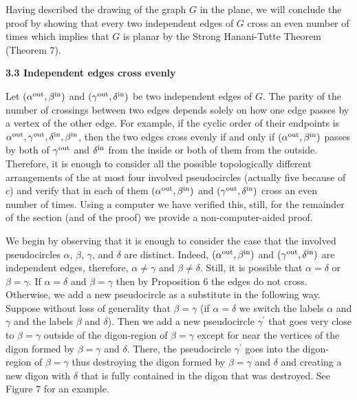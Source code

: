 \par
\par
Having described the drawing of the graph $G$ in the plane, we will conclude the proof by showing that every two independent edges of $G$ cross an even number of times which implies that $G$ is planar by the Strong Hanani-Tutte Theorem (Theorem 7).
\par
\par
\par
\par\medskip\noindent\textbf{3.3 Independent edges cross evenly}\par
Let $(\alpha^{\rm out},\beta^{\rm in})$ and $(\gamma^{\rm out},\delta^{\rm in})$ be two independent edges of $G$. The parity of the number of crossings between two edges depends solely on how one edge passes by a vertex of the other edge. For example, if the cyclic order of their endpoints is $\alpha^{\rm out},\gamma^{\rm out},\delta^{\rm in},\beta^{\rm in}$, then the two edges cross evenly if and only if $(\alpha^{\rm out},\beta^{\rm in})$ passes by both of $\gamma^{\rm out}$ and $\delta^{\rm in}$ from the inside or both of them from the outside. Therefore, it is enough to consider all the possible topologically different arrangements of the at most four involved pseudocircles (actually five because of $c$) and verify that in each of them $(\alpha^{\rm out},\beta^{\rm in})$ and $(\gamma^{\rm out},\delta^{\rm in})$ cross an even number of times. Using a computer we have verified this, still, for the remainder of the section (and of the proof) we provide a non-computer-aided proof.
\par
\par
We begin by observing that it is enough to consider the case that the involved pseudocircles $\alpha$, $\beta$, $\gamma$, and $\delta$ are distinct. Indeed, $(\alpha^{\rm out},\beta^{\rm in})$ and $(\gamma^{\rm out},\delta^{\rm in})$ are independent edges, therefore, $\alpha\neq\gamma$ and $\beta\neq\delta$. Still, it is possible that $\alpha=\delta$ or $\beta=\gamma$. If $\alpha=\delta$ and $\beta=\gamma$ then by Proposition 6 the edges do not cross. Otherwise, we add a new pseudocircle as a substitute in the following way. Suppose without loss of generality that $\beta=\gamma$ (if $\alpha=\delta$ we switch the labels $\alpha$ and $\gamma$ and the labels $\beta$ and $\delta$). Then we add a new pseudocircle $\gamma^{\prime}$ that goes very close to $\beta=\gamma$ outside of the digon-region of $\beta=\gamma$ except for near the vertices of the digon formed by $\beta=\gamma$ and $\delta$. There, the pseudocircle $\gamma^{\prime}$ goes into the digon-region of $\beta=\gamma$ thus destroying the digon formed by $\beta=\gamma$ and $\delta$ and creating a new digon with $\delta$ that is fully contained in the digon that was destroyed. See Figure 7 for an example.
